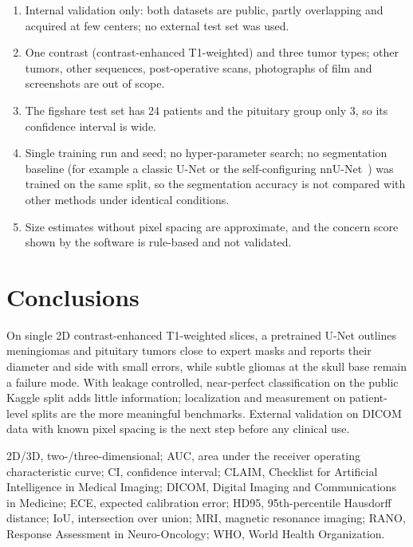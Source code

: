 \documentclass[pdflatex,sn-vancouver-num]{sn-jnl}
\begin{document}
\begin{enumerate}
\item Internal validation only: both datasets are public, partly overlapping and acquired at few centers; no external test set was used.
\item One contrast (contrast-enhanced T1-weighted) and three tumor types; other tumors, other sequences, post-operative scans, photographs of film and screenshots are out of scope.
\item The figshare test set has 24 patients and the pituitary group only 3, so its confidence interval is wide.
\item Single training run and seed; no hyper-parameter search; no segmentation baseline (for example a classic U-Net or the self-configuring nnU-Net~\cite{isensee2021nnunet}) was trained on the same split, so the segmentation accuracy is not compared with other methods under identical conditions.
\item Size estimates without pixel spacing are approximate, and the concern score shown by the software is rule-based and not validated.
\end{enumerate}

\section{Conclusions}\label{sec:conclusions}

On single 2D contrast-enhanced T1-weighted slices, a pretrained U-Net outlines meningiomas and pituitary tumors close to expert masks and reports their diameter and side with small errors, while subtle gliomas at the skull base remain a failure mode. With leakage controlled, near-perfect classification on the public Kaggle split adds little information; localization and measurement on patient-level splits are the more meaningful benchmarks. External validation on DICOM data with known pixel spacing is the next step before any clinical use.

\backmatter

2D/3D, two-/three-dimensional; AUC, area under the receiver operating characteristic curve; CI, confidence interval; CLAIM, Checklist for Artificial Intelligence in Medical Imaging; DICOM, Digital Imaging and Communications in Medicine; ECE, expected calibration error; HD95, 95th-percentile Hausdorff distance; IoU, intersection over union; MRI, magnetic resonance imaging; RANO, Response Assessment in Neuro-Oncology; WHO, World Health Organization.
\end{document}
